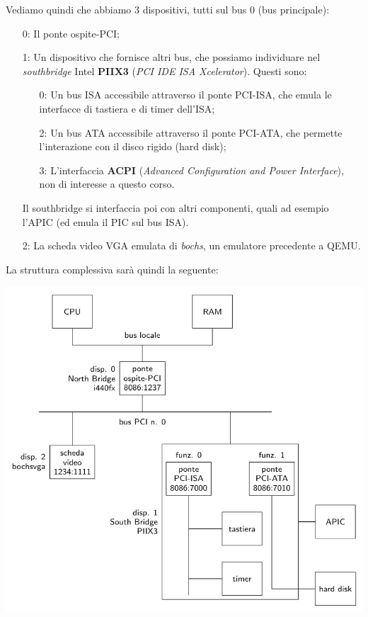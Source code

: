 \documentclass[a4paper,11pt]{article}
\begin{document}
\par\medskip

Vediamo quindi che abbiamo 3 dispositivi, tutti sul bus 0 (bus principale):
\begin{enumerate}
	\item[0:] Il ponte ospite-PCI;
	\item[1:] Un dispositivo che fornisce altri bus, che possiamo individuare nel \textit{southbridge} Intel \textbf{PIIX3} (\textit{PCI IDE ISA Xcelerator}). Questi sono:
		\begin{enumerate}
			\item[0:] Un bus ISA accessibile attraverso il ponte PCI-ISA, che emula le interfacce di tastiera e di timer dell'ISA;
			\item[2:] Un bus ATA accessibile attraverso il ponte PCI-ATA, che permette l'interazione con il disco rigido (hard disk);
			\item[3:] L'interfaccia \textbf{ACPI} (\textit{Advanced Configuration and Power Interface}), non di interesse a questo corso.
		\end{enumerate}
		Il southbridge si interfaccia poi con altri componenti, quali ad esempio l'APIC (ed emula il PIC sul bus ISA).
	\item[2:] La scheda video VGA emulata di \textit{bochs}, un emulatore precedente a QEMU.
\end{enumerate}

\noindent
\begin{minipage}{\textwidth}
La struttura complessiva sarà quindi la seguente:

\begin{center}
	\includegraphics[scale=0.55]{../figures/pci_space.png}
\end{center}

\end{minipage}
\end{document}
